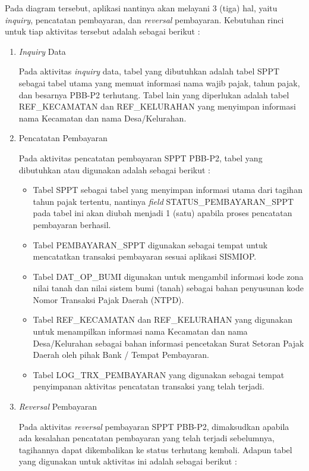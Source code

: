 \documentclass[pdftex,12pt, oneside]{article}
\begin{document}
Pada diagram tersebut, aplikasi nantinya akan melayani 3 (tiga) hal, yaitu \textit{inquiry}, pencatatan pembayaran, dan \textit{reversal} pembayaran. Kebutuhan rinci untuk tiap aktivitas tersebut adalah sebagai berikut :

\begin{enumerate}[1.]
	\item \textit{Inquiry} Data
	
	Pada aktivitas \textit{inquiry} data, tabel yang dibutuhkan adalah tabel SPPT sebagai tabel utama yang memuat informasi nama wajib pajak, tahun pajak, dan besarnya PBB-P2 terhutang. Tabel lain yang diperlukan adalah tabel REF\_KECAMATAN dan REF\_KELURAHAN yang menyimpan informasi nama Kecamatan dan nama Desa/Kelurahan. 
	
	\item Pencatatan Pembayaran
	
	Pada aktivitas pencatatan pembayaran SPPT PBB-P2, tabel yang dibutuhkan atau digunakan adalah sebagai berikut :
	
	\begin{itemize}
		\item Tabel SPPT sebagai tabel yang menyimpan informasi utama dari tagihan tahun pajak tertentu, nantinya \textit{field} STATUS\_PEMBAYARAN\_SPPT pada tabel ini akan diubah menjadi 1 (satu) apabila proses pencatatan pembayaran berhasil.
		\item Tabel PEMBAYARAN\_SPPT digunakan sebagai tempat untuk mencatatkan transaksi pembayaran sesuai aplikasi SISMIOP. 
		\item Tabel DAT\_OP\_BUMI digunakan untuk mengambil informasi kode zona nilai tanah dan nilai sistem bumi (tanah) sebagai bahan penyusunan kode Nomor Transaksi Pajak Daerah (NTPD).
		\item Tabel REF\_KECAMATAN dan REF\_KELURAHAN yang digunakan untuk menampilkan informasi nama Kecamatan dan nama Desa/Kelurahan sebagai bahan informasi pencetakan Surat Setoran Pajak Daerah oleh pihak Bank / Tempat Pembayaran.
		\item Tabel LOG\_TRX\_PEMBAYARAN yang digunakan sebagai tempat penyimpanan aktivitas pencatatan transaksi yang telah terjadi.
	\end{itemize} 
	
	\item \textit{Reversal} Pembayaran
	
	Pada aktivitas \textit{reversal} pembayaran SPPT PBB-P2, dimaksudkan apabila ada kesalahan pencatatan pembayaran yang telah terjadi sebelumnya, tagihannya dapat dikembalikan ke status terhutang kembali. Adapun tabel yang digunakan untuk aktivitas ini adalah sebagai berikut :
	

\end{enumerate}
\end{document}
